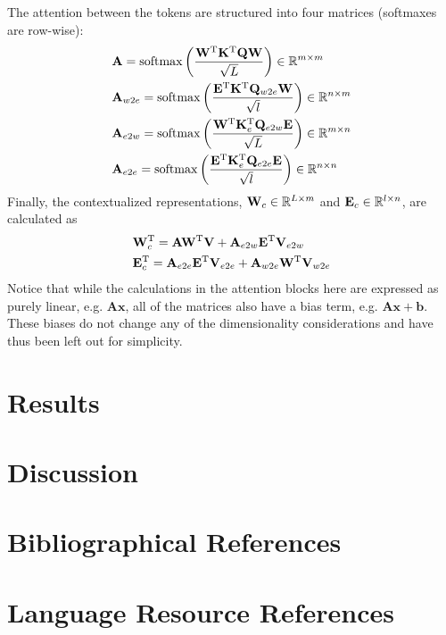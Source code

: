 \documentclass[10pt, a4paper]{article}
\newcommand{\softmax}{\operatorname{softmax}}
\begin{document}
The attention between the tokens are structured into four matrices (softmaxes are row-wise):
\begin{align*}
        &\mathbf A = \softmax\left(\frac{\transpose{\mathbf W}\transpose{\mathbf K}\mathbf Q\mathbf W}{\sqrt{L}}\right)\in\RR^{m\times m}\\
        &\mathbf A_{w2e} = \softmax\left(\frac{\transpose{\mathbf E}\transpose{\mathbf K}\mathbf Q_{w2e}\mathbf W}{\sqrt{l}}\right)\in\RR^{n\times m}\\
        &\mathbf A_{e2w} = \softmax\left(\frac{\transpose{\mathbf W}\transpose{\mathbf K_e}\mathbf Q_{e2w}\mathbf E}{\sqrt{L}}\right)\in\RR^{m\times n}\\
        &\mathbf A_{e2e} = \softmax\left(\frac{\transpose{\mathbf E}\transpose{\mathbf K_e}\mathbf Q_{e2e}\mathbf E}{\sqrt{l}}\right)\in\RR^{n\times n}
\end{align*}
Finally, the contextualized representations, $ \mathbf W_{c}\in\mathbb R^{L\times m} $ and $ \mathbf E_{c}\in\mathbb R^{l\times n} $, are calculated as
\begin{align*}
    &\mathbf W_c^{\textup T} = \mathbf A\mathbf W^{\textup T}\mathbf V
        + \mathbf A_{e2w}\mathbf E^{\textup T}\mathbf V_{e2w} \\
        &\mathbf E_c^{\textup T} = \mathbf A_{e2e}\mathbf E^{\textup T}\mathbf V_{e2e}
        + \mathbf A_{w2e}\mathbf W^{\textup T}\mathbf V_{w2e}
\end{align*}
Notice that while the calculations in the attention blocks here are expressed as purely linear, e.g. $ \mathbf A\mathbf x $, all of the matrices also have a bias term, e.g. $ \mathbf A\mathbf x+\mathbf b $.
These biases do not change any of the dimensionality considerations and have thus been left out for simplicity.

\section{Results}

\section{Discussion}

\section{Bibliographical References}\label{reference}




\section{Language Resource References}
\label{lr:ref}
\end{document}
